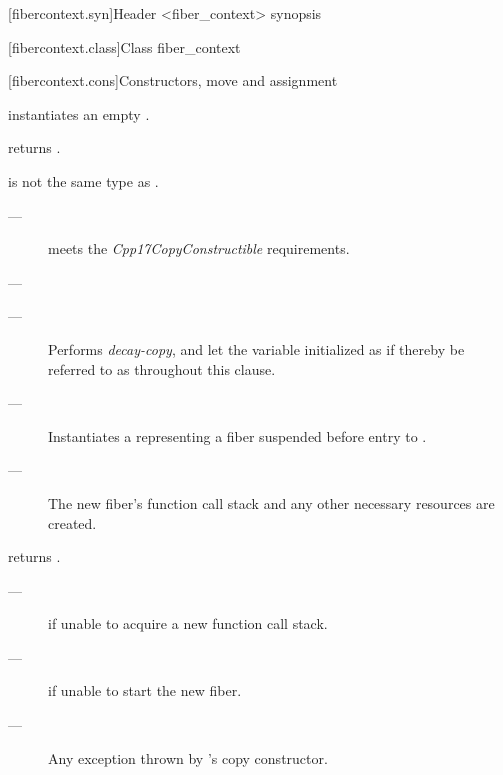 [fibercontext.syn]{Header <fiber\_context> synopsis}


[fibercontext.class]{Class fiber\_context}


\newcommand{\state}{\cpp{state}}

[fibercontext.cons]{Constructors, move and assignment}
\label{constructor}

\effects
instantiates an empty \fiber.

\postcond
\emptyfn returns \true.


\constraints
{} is not the same type as \fiber.

\mandates
\begin{description}
    \item[---]  meets the \emph{Cpp17CopyConstructible} requirements.
    \item[---] 
\end{description}

\effects
\begin{description}
    \item[---] Performs \emph{decay-copy}, and let the variable initialized as if thereby be referred to as  throughout this clause.
    \item[---] Instantiates a \fiber representing a fiber suspended before
              entry to .
    \item[---] The new fiber's function call stack and any other necessary
              resources are created.
\end{description}

\postcond
\emptyfn returns \false.

\except
\begin{description}
    \item[---]  if unable to acquire a new function call stack.
    \item[---]  if unable to start the new fiber.
    \item[---] Any exception thrown by 's copy constructor.
\end{description}

